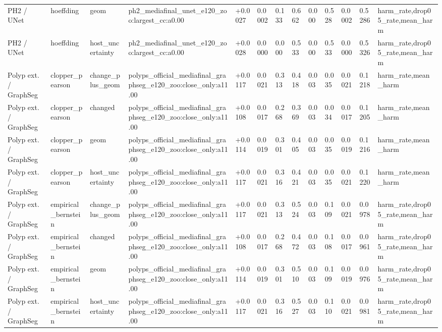 \begin{table}[t]
\begin{tabular}{lllllllllllll}
PH2 / UNet & hoeffding & geom & ph2\_mediafinal\_unet\_e120\_zoo:largest\_cc:a0.00 & +0.0027 & 0.0002 & 0.133 & 0.662 & 0.000 & 0.528 & 0.0002 & 0.5286 & harm\_rate,drop05\_rate,mean\_harm \\
PH2 / UNet & hoeffding & host\_uncertainty & ph2\_mediafinal\_unet\_e120\_zoo:largest\_cc:a0.00 & +0.0028 & 0.0000 & 0.000 & 0.533 & 0.000 & 0.533 & 0.0000 & 0.5326 & harm\_rate,drop05\_rate,mean\_harm \\
Polyp ext. / GraphSeg & clopper\_pearson & change\_plus\_geom & polyps\_official\_mediafinal\_graphseg\_e120\_zoo:close\_only:a11.00 & +0.0117 & 0.0021 & 0.313 & 0.418 & 0.003 & 0.035 & 0.0021 & 0.1218 & harm\_rate,mean\_harm \\
Polyp ext. / GraphSeg & clopper\_pearson & changed & polyps\_official\_mediafinal\_graphseg\_e120\_zoo:close\_only:a11.00 & +0.0108 & 0.0017 & 0.268 & 0.369 & 0.003 & 0.034 & 0.0017 & 0.1205 & harm\_rate,mean\_harm \\
Polyp ext. / GraphSeg & clopper\_pearson & geom & polyps\_official\_mediafinal\_graphseg\_e120\_zoo:close\_only:a11.00 & +0.0114 & 0.0019 & 0.301 & 0.405 & 0.003 & 0.035 & 0.0019 & 0.1216 & harm\_rate,mean\_harm \\
Polyp ext. / GraphSeg & clopper\_pearson & host\_uncertainty & polyps\_official\_mediafinal\_graphseg\_e120\_zoo:close\_only:a11.00 & +0.0117 & 0.0021 & 0.316 & 0.421 & 0.003 & 0.035 & 0.0021 & 0.1220 & harm\_rate,mean\_harm \\
Polyp ext. / GraphSeg & empirical\_bernstein & change\_plus\_geom & polyps\_official\_mediafinal\_graphseg\_e120\_zoo:close\_only:a11.00 & +0.0117 & 0.0021 & 0.313 & 0.524 & 0.003 & 0.109 & 0.0021 & 0.0978 & harm\_rate,drop05\_rate,mean\_harm \\
Polyp ext. / GraphSeg & empirical\_bernstein & changed & polyps\_official\_mediafinal\_graphseg\_e120\_zoo:close\_only:a11.00 & +0.0108 & 0.0017 & 0.268 & 0.472 & 0.003 & 0.108 & 0.0017 & 0.0961 & harm\_rate,drop05\_rate,mean\_harm \\
Polyp ext. / GraphSeg & empirical\_bernstein & geom & polyps\_official\_mediafinal\_graphseg\_e120\_zoo:close\_only:a11.00 & +0.0114 & 0.0019 & 0.301 & 0.510 & 0.003 & 0.109 & 0.0019 & 0.0976 & harm\_rate,drop05\_rate,mean\_harm \\
Polyp ext. / GraphSeg & empirical\_bernstein & host\_uncertainty & polyps\_official\_mediafinal\_graphseg\_e120\_zoo:close\_only:a11.00 & +0.0117 & 0.0021 & 0.316 & 0.527 & 0.003 & 0.110 & 0.0021 & 0.0981 & harm\_rate,drop05\_rate,mean\_harm \\

\end{tabular}
\end{table}
